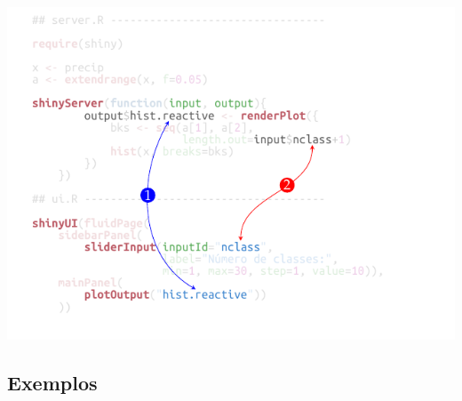 \begin{frame}
\vspace{-1.0cm}
\includegraphics[scale=0.85]{./tikz/hist_slider_shiny-2.pdf}
\end{frame}


\subsection*{Exemplos}

